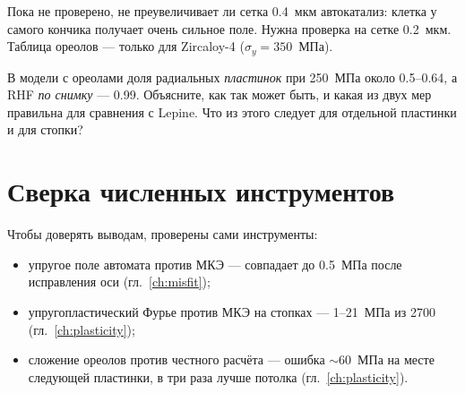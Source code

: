 \begin{warnbox}
Пока не проверено, не преувеличивает ли сетка 0.4~мкм автокатализ: клетка у самого кончика
получает очень сильное поле. Нужна проверка на сетке 0.2~мкм. Таблица ореолов --- только для
Zircaloy-4 ($\sigma_y=350$~МПа).
\end{warnbox}

\begin{exercise}
В модели с ореолами доля радиальных \emph{пластинок} при 250~МПа около 0.5--0.64, а RHF
\emph{по снимку} --- 0.99. Объясните, как так может быть, и какая из двух мер правильна для
сравнения с Lepine. Что из этого следует для отдельной пластинки и для стопки?
\end{exercise}

\section{Сверка численных инструментов}

Чтобы доверять выводам, проверены сами инструменты:
\begin{itemize}
\item упругое поле автомата против МКЭ --- совпадает до 0.5~МПа после исправления оси
  (гл.~\ref{ch:misfit});
\item упругопластический Фурье против МКЭ на стопках --- 1--21~МПа из 2700 (гл.~\ref{ch:plasticity});
\item сложение ореолов против честного расчёта --- ошибка $\sim60$~МПа на месте следующей
  пластинки, в три раза лучше потолка (гл.~\ref{ch:plasticity}).
\end{itemize}
